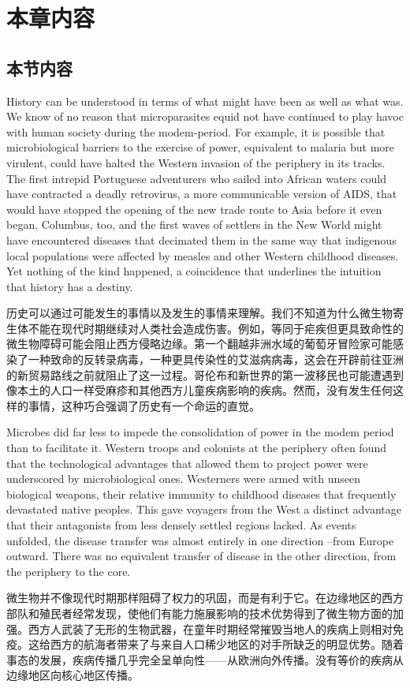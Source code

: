 \chapter{本章内容}

\section{本节内容}

\begin{paracol}{2}

History can be understood in terms of what might have been as well as what was. We know of no reason that microparasites equid not have continued to play havoc with human society during the modem-period. For example, it is possible that microbiological barriers to the exercise of power, equivalent to malaria but more virulent, could have halted the Western invasion of the periphery in its tracks. The first intrepid Portuguese adventurers who sailed into African waters could have contracted a deadly retrovirus, a more communicable version of AIDS, that would have stopped the opening of the new trade route to Asia before it even began. Columbus, too, and the first waves of settlers in the New World might have encountered diseases that decimated them in the same way that indigenous local populations were affected by measles and other Western childhood diseases. Yet nothing of the kind happened, a coincidence that underlines the intuition that history has a destiny.

\switchcolumn
历史可以通过可能发生的事情以及发生的事情来理解。我们不知道为什么微生物寄生体不能在现代时期继续对人类社会造成伤害。例如，等同于疟疾但更具致命性的微生物障碍可能会阻止西方侵略边缘。第一个翻越非洲水域的葡萄牙冒险家可能感染了一种致命的反转录病毒，一种更具传染性的艾滋病病毒，这会在开辟前往亚洲的新贸易路线之前就阻止了这一过程。哥伦布和新世界的第一波移民也可能遭遇到像本土的人口一样受麻疹和其他西方儿童疾病影响的疾病。然而，没有发生任何这样的事情，这种巧合强调了历史有一个命运的直觉。

\switchcolumn*
Microbes did far less to impede the consolidation of power in the modem period than to facilitate it. Western troops and colonists at the periphery often found that the technological advantages that allowed them to project power were underscored by microbiological ones. Westerners were armed with unseen biological weapons, their relative immunity to childhood diseases that frequently devastated native peoples. This gave voyagers from the West a distinct advantage that their antagonists from less densely settled regions lacked. As events unfolded, the disease transfer was almost entirely in one direction --from Europe outward. There was no equivalent transfer of disease in the other direction, from the periphery to the core. 

\switchcolumn
微生物并不像现代时期那样阻碍了权力的巩固，而是有利于它。在边缘地区的西方部队和殖民者经常发现，使他们有能力施展影响的技术优势得到了微生物方面的加强。西方人武装了无形的生物武器，在童年时期经常摧毁当地人的疾病上则相对免疫。这给西方的航海者带来了与来自人口稀少地区的对手所缺乏的明显优势。随着事态的发展，疾病传播几乎完全呈单向性——从欧洲向外传播。没有等价的疾病从边缘地区向核心地区传播。

\end{paracol}